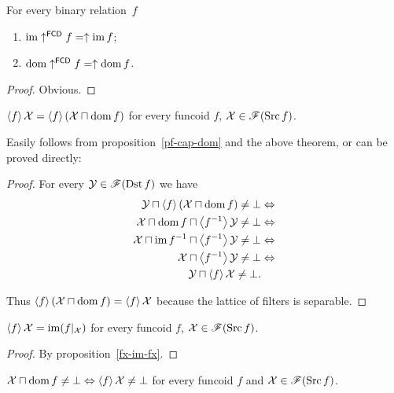 \begin{prop}
For every binary relation~$f$
\begin{enumerate}
\item $\operatorname{im}\uparrow^{\mathsf{FCD}}f=\uparrow\operatorname{im} f$;
\item $\operatorname{dom}\uparrow^{\mathsf{FCD}}f=\uparrow\operatorname{dom} f$.
\end{enumerate}
\end{prop}

\begin{proof}
Obvious.
\end{proof}

\begin{prop}
$\left\langle f\right\rangle\mathcal{X}=\left\langle f\right\rangle(\mathcal{X}\sqcap\operatorname{dom} f)$ for every
funcoid $f$, $\mathcal{X}\in\mathscr{F}(\operatorname{Src} f)$.
\end{prop}

Easily follows from proposition~\ref{pf-cap-dom} and the above theorem, or can be proved directly:

\begin{proof}
For every $\mathcal{Y}\in\mathscr{F}(\operatorname{Dst} f)$ we have
\begin{align*}
\mathcal{Y}\sqcap\left\langle f\right\rangle(\mathcal{X}\sqcap\operatorname{dom} f)\ne\bot
& \Leftrightarrow\\
\mathcal{X}\sqcap\operatorname{dom} f\sqcap\left\langle f^{-1}\right\rangle\mathcal{Y}\ne\bot & \Leftrightarrow\\
\mathcal{X}\sqcap\operatorname{im}
f^{-1}\sqcap\left\langle f^{-1}\right\rangle\mathcal{Y}\ne\bot &
\Leftrightarrow\\
\mathcal{X}\sqcap\left\langle f^{-1}\right\rangle\mathcal{Y}\ne\bot &
\Leftrightarrow\\
\mathcal{Y}\sqcap\left\langle f\right\rangle\mathcal{X}\ne\bot.
\end{align*}


Thus $\left\langle f\right\rangle(\mathcal{X}\sqcap\operatorname{dom} f)=\left\langle f\right\rangle\mathcal{X}$ because
the lattice of filters is separable.\end{proof}
\begin{prop}
$\left\langle f\right\rangle\mathcal{X}=\operatorname{im}(f|_{\mathcal{X}})$ for every funcoid $f$,
$\mathcal{X}\in\mathscr{F}(\operatorname{Src} f)$.\end{prop}

\begin{proof}
By proposition~\ref{fx-im-fx}.
\end{proof}

\begin{prop}\label{x-dom-fcd}
$\mathcal{X}\sqcap\operatorname{dom} f\ne\bot\Leftrightarrow\left\langle f\right\rangle\mathcal{X}\ne\bot$
for every funcoid $f$ and $\mathcal{X}\in\mathscr{F}(\operatorname{Src} f)$.
\end{prop}

